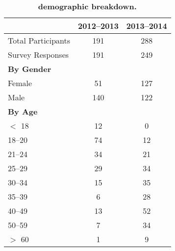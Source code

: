 \begin{table}[t]

{\small
\begin{tabularx}{\linewidth}{Xcc}

& \normalsize{\textbf{2012--2013}}
& \normalsize{\textbf{2013--2014}} \\ \toprule

Total Participants & 191 & 288 \\
Survey Responses & 191 & 249 \\[0.05in] 

\multicolumn{3}{l}{\textbf{By Gender}} \\ \midrule
Female & 51 & 127 \\
Male & 140 & 122 \\[0.05in]

\multicolumn{3}{l}{\textbf{By Age}} \\ \midrule
$<$ 18 & 12 & 0 \\
18--20 & 74 & 12 \\
21--24 & 34 & 21 \\
25--29 & 29 & 34 \\
30--34 & 15 & 35 \\
35--39 & 6 & 28 \\
40--49 & 13 & 52 \\
50--59 & 7 & 34 \\
$>$ 60 & 1 & 9 \\

\end{tabularx}
}

\caption{\textbf{\PhoneLab{} demographic breakdown.}}

\label{table-demographics}

\vspace*{-0.1in}

\end{table}
